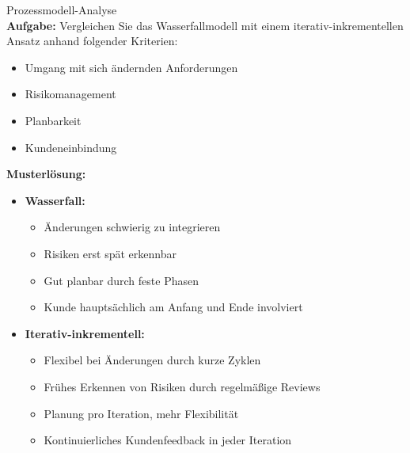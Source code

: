 \begin{example2}{Prozessmodell-Analyse}\\
\textbf{Aufgabe:} Vergleichen Sie das Wasserfallmodell mit einem iterativ-inkrementellen Ansatz anhand folgender Kriterien:
\begin{itemize}
    \item Umgang mit sich ändernden Anforderungen
    \item Risikomanagement
    \item Planbarkeit
    \item Kundeneinbindung
\end{itemize}

\textbf{Musterlösung:}
\begin{itemize}
    \item \textbf{Wasserfall:}
    \begin{itemize}
        \item Änderungen schwierig zu integrieren
        \item Risiken erst spät erkennbar
        \item Gut planbar durch feste Phasen
        \item Kunde hauptsächlich am Anfang und Ende involviert
    \end{itemize}
    \item \textbf{Iterativ-inkrementell:}
    \begin{itemize}
        \item Flexibel bei Änderungen durch kurze Zyklen
        \item Frühes Erkennen von Risiken durch regelmäßige Reviews
        \item Planung pro Iteration, mehr Flexibilität
        \item Kontinuierliches Kundenfeedback in jeder Iteration
    \end{itemize}
\end{itemize}
\end{example2}

